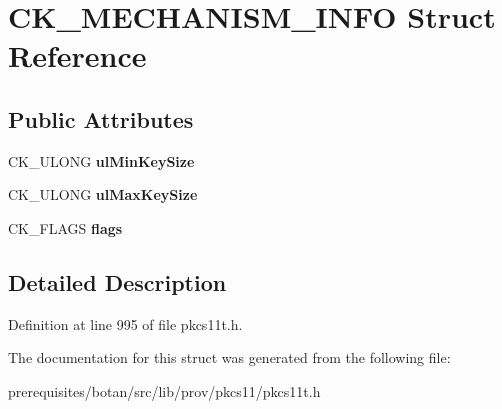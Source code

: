 \hypertarget{struct_c_k___m_e_c_h_a_n_i_s_m___i_n_f_o}{}\section{C\+K\+\_\+\+M\+E\+C\+H\+A\+N\+I\+S\+M\+\_\+\+I\+N\+FO Struct Reference}
\label{struct_c_k___m_e_c_h_a_n_i_s_m___i_n_f_o}
\subsection*{Public Attributes}
\begin{DoxyCompactItemize}
\item 
\mbox{\label{struct_c_k___m_e_c_h_a_n_i_s_m___i_n_f_o_a4cfb88703adbce245090f1761cf155c3}} 
C\+K\+\_\+\+U\+L\+O\+NG {\bfseries ul\+Min\+Key\+Size}
\item 
\mbox{\label{struct_c_k___m_e_c_h_a_n_i_s_m___i_n_f_o_ab5833180294f1a83f91a5ed8ccda92d6}} 
C\+K\+\_\+\+U\+L\+O\+NG {\bfseries ul\+Max\+Key\+Size}
\item 
\mbox{\label{struct_c_k___m_e_c_h_a_n_i_s_m___i_n_f_o_ad40ae095abd3c1512a5fc08ea208783a}} 
C\+K\+\_\+\+F\+L\+A\+GS {\bfseries flags}
\end{DoxyCompactItemize}


\subsection{Detailed Description}


Definition at line 995 of file pkcs11t.\+h.



The documentation for this struct was generated from the following file\+:\begin{DoxyCompactItemize}
\item 
prerequisites/botan/src/lib/prov/pkcs11/pkcs11t.\+h\end{DoxyCompactItemize}
